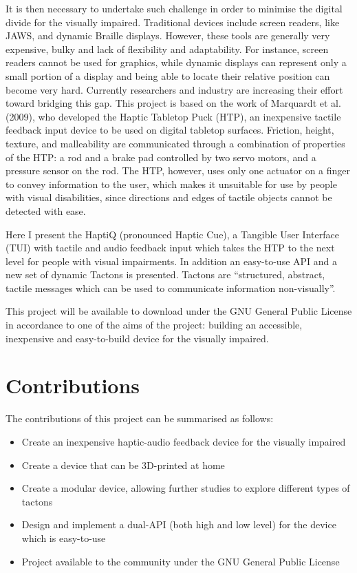 It is then necessary to undertake such challenge in order to minimise the digital divide for the visually impaired. Traditional devices include screen readers, like JAWS\cite{JAWS}, and dynamic Braille displays\cite{HumanWare, shimada2010development, blindMaps}. However, these tools are generally very expensive, bulky and lack of flexibility and adaptability. For instance, screen readers cannot be used for graphics, while dynamic displays can represent only a small portion of a display and being able to locate their relative position can become very hard.
Currently researchers and industry are increasing their effort toward bridging this gap. This project is based on the work of Marquardt et al.(2009)\nocite{marquardt2009haptic}, who developed the Haptic Tabletop Puck (HTP), an inexpensive tactile feedback input device to be used on digital tabletop surfaces. Friction, height, texture, and malleability are communicated through a combination of properties of the HTP: a rod and a brake pad controlled by two servo motors, and a pressure sensor on the rod. The HTP, however, uses only one actuator on a finger to convey information to the user, which makes it unsuitable for use by people with visual disabilities, since directions and edges of tactile objects cannot be detected with ease. \par

Here I present the HaptiQ (pronounced Haptic Cue), a Tangible User Interface (TUI)\cite{ishii1997tangible} with tactile and audio feedback input which takes the HTP to the next level for people with visual impairments. In addition an easy-to-use API and a new set of dynamic Tactons is presented. Tactons are ``structured, abstract, tactile messages which can be used to communicate information non-visually''\cite{brown2005first}.\par
This project will be available to download under the GNU General Public License in accordance to one of the aims of the project: building an accessible, inexpensive and easy-to-build device for the visually impaired. \par

\section{Contributions}

The contributions of this project can be summarised as follows:
\begin{itemize}
	\item Create an inexpensive haptic-audio feedback device for the visually impaired
    \item Create a device that can be 3D-printed at home
    \item Create a modular device, allowing further studies to explore different types of tactons
    \item Design and implement a dual-API (both high and low level) for the device which is easy-to-use
    \item Project available to the community under the GNU General Public License 
\end{itemize}

